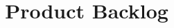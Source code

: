 \documentclass{article}
\title{Product Backlog}
\begin{document}
	\maketitle
	
	\begin{tabular}{l}
		
	\end{tabular}
\end{document}
